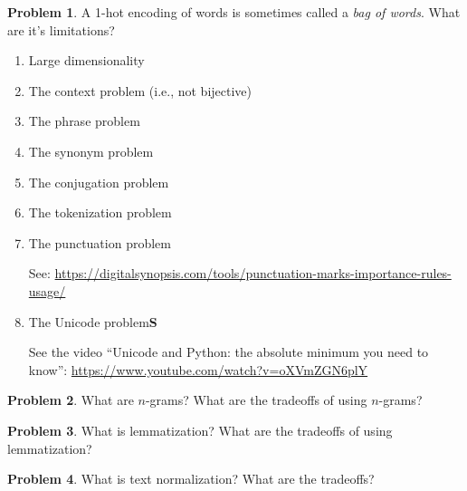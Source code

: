 \documentclass[10pt]{article}
\theoremstyle{definition}
\newtheorem{problem}{Problem}
\begin{document}
\newpage
\begin{problem}
    A 1-hot encoding of words is sometimes called a \emph{bag of words}.
    What are it's limitations?
    \begin{enumerate}
        \item Large dimensionality
            \vspace{3in}
            \newpage
        \item The context problem (i.e., not bijective)
            \vspace{3in}
        \item The phrase problem
            \vspace{3in}
        \item The synonym problem
            \vspace{3in}
        \item The conjugation problem
            \vspace{3in}
        \item The tokenization problem
            \vspace{3in}
        \item The punctuation problem

            See: \url{https://digitalsynopsis.com/tools/punctuation-marks-importance-rules-usage/}
            \vspace{3in}
        \item The Unicode problem\textbf{S}
            
            See the video ``Unicode and Python: the absolute minimum you need to know'': \url{https://www.youtube.com/watch?v=oXVmZGN6plY}
    \end{enumerate}
\end{problem}

\newpage
\begin{problem}
    What are $n$-grams?
    What are the tradeoffs of using $n$-grams?
\end{problem}

\newpage
\begin{problem}
    What is lemmatization?
    What are the tradeoffs of using lemmatization?
\end{problem}

\newpage
\begin{problem}
    What is text normalization?
    What are the tradeoffs?
\end{problem}
\end{document}
